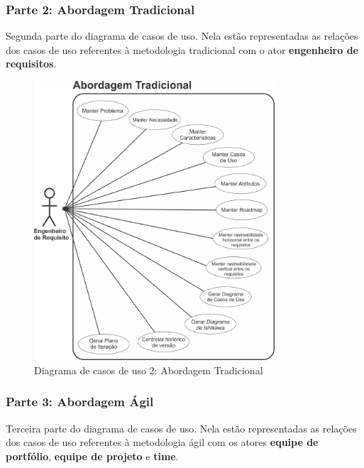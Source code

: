 \subsubsection{Parte 2: Abordagem Tradicional}
	Segunda parte do diagrama de casos de uso. Nela estão representadas as relações dos casos de uso referentes à metodologia tradicional com o ator \textbf{engenheiro de requisitos}.
	\\
\begin{figure}[H]
	\centering
	\includegraphics[width=0.8\textwidth]{imgModelagem/DiagramaUC2}
	\caption{Diagrama de casos de uso 2: Abordagem Tradicional}
	\label{img:DiagramaUC2}
\end{figure}

\newpage
\subsubsection{Parte 3: Abordagem Ágil}
	Terceira parte do diagrama de casos de uso. Nela estão representadas as relações dos casos de uso referentes à metodologia ágil com os atores \textbf{equipe de portfólio}, \textbf{equipe de projeto} e \textbf{time}.

